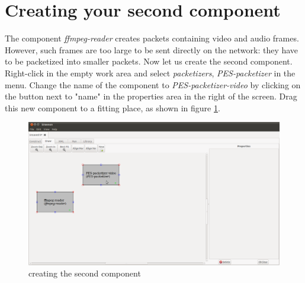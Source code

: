 \documentclass[12pt]{report}
\begin{document}
\section{Creating your second component}
The component \textit{ffmpeg-reader} creates packets containing video and audio frames. However, such frames are too large to be sent directly on the network: they have to be packetized into smaller packets. Now let us create the second component. Right-click in the empty work area and select \textit{packetizers}, \textit{PES-packetizer} in the menu. Change the name of the component to \textit{PES-packetizer-video} by clicking on the button next to "name" in the properties area in the right of the screen. Drag this new component to a fitting place, as shown in figure \ref{fig:9}.
\begin{center}
\begin{figure}[!ht]
	\includegraphics[width=1.0\textwidth]{./images/ui04.png}
	\caption{creating the second component}
	\label{fig:9}
\end{figure}
\end{center}
\newpage
\end{document}
